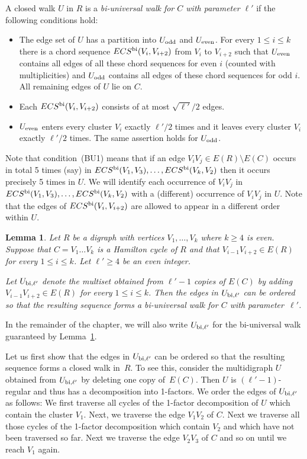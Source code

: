 \documentclass{memo-l}
\newtheorem{lemma}[firstthm]{Lemma}
\def\COMMENT#1{}
\def\proof{\removelastskip\penalty55\medskip\noindent{\bf Proof. }}
\numberwithin{section}{chapter}
\numberwithin{equation}{section}
\numberwithin{firstthm}{section}
\numberwithin{figure}{section}
\begin{document}
{A closed walk $U$ in $R$ is a \emph{bi-universal walk for $C$
with parameter $\ell'$} if the following conditions hold:
\begin{itemize}
\item[(BU1)] The edge set of $U$ has a partition into $U_{\rm odd}$ and $U_{\rm even}$.
For every $1\le i\le k$ there is a chord sequence $ECS^{\rm bi}(V_i,V_{i+2})$
from $V_i$ to $V_{i+2}$ such that $U_{\rm even}$ contains all edges of all these chord sequences for even $i$ (counted with multiplicities)
and $U_{\rm odd}$ contains all edges of these chord sequences for odd $i$.
All remaining edges of $U$ lie on $C$.
\item[(BU2)] Each $ECS^{\rm bi}(V_i,V_{i+2})$ consists of at most $\sqrt{\ell'}/2$ edges.
\item[(BU3)] $U_{\rm even}$ enters every cluster
$V_i$ exactly $\ell'/2$ times and it leaves every cluster $V_i$ exactly $\ell'/2$ times.
The same assertion holds for $U_{\rm odd}$.%
\COMMENT{So need to make sure $\ell'$ is even when we apply this.}
\end{itemize} 
Note that condition~(BU1) means that if an edge $V_iV_j\in E(R)\setminus E(C)$ occurs in total 5 times (say) in
$ECS^{{\rm bi}}(V_1,V_3),\dots,ECS^{{\rm bi}}(V_{k},V_2)$ then it occurs precisely 5 times in $U$. We will identify each occurrence of $V_iV_j$ in
$ECS^{{\rm bi}}(V_1,V_3),\dots,ECS^{{\rm bi}}(V_{k},V_2)$ with a (different) occurrence of $V_iV_j$ in $U$. 
Note that the edges of $ECS^{{\rm bi}}(V_i,V_{i+2})$ are allowed to appear in a different order %
within $U$.

\begin{lemma}\label{lem:univwalkzz}
Let $R$ be a digraph with vertices $V_1,\dots,V_k$ where $k \geq 4$ is even.
 Suppose that $C=V_1\dots V_k$ is a Hamilton cycle of $R$
and that $V_{i-1}V_{i+2}\in E(R)$ for every $1\le i\le k$. Let $\ell'\ge 4$ be an even integer.%
\COMMENT{need 4 rather than 2 to ensure $1 \le \sqrt{\ell'}/2$.}
 Let $U_{{\rm bi},\ell'}$ denote the multiset obtained from
$\ell'-1$ copies of $E(C)$ by adding
$V_{i-1}V_{i+2}\in E(R)$ for every $1\le i\le k$. Then the edges in $U_{{\rm bi},\ell'}$ can be ordered so that the
resulting sequence forms a bi-universal walk for $C$ with parameter~$\ell'$.
\end{lemma}
In the remainder of the chapter, we will also write $U_{{\rm bi},\ell'}$ for the bi-universal walk guaranteed by Lemma~\ref{lem:univwalkzz}. 

\proof
Let us first show that the edges in $U_{{\rm bi},\ell'}$ can be ordered so that the resulting sequence forms a closed walk in~$R$.
To see this, consider the multidigraph $U$ obtained from $U_{{\rm bi},\ell'}$ by deleting one copy of~$E(C)$.
Then $U$ is $(\ell'-1)$-regular and thus has a decomposition into 1-factors. We order the edges of $U_{{\rm bi},\ell'}$ as follows: 
We first traverse all cycles of the 1-factor decomposition of $U$ which contain the cluster $V_1$.
Next, we traverse the edge $V_1V_2$ of $C$. Next we traverse all those cycles of the 1-factor decomposition which contain
$V_2$ and which have not been traversed so far. Next we traverse the edge $V_2V_3$ of $C$ and so on
until we reach $V_1$ again. 

}
\end{document}

